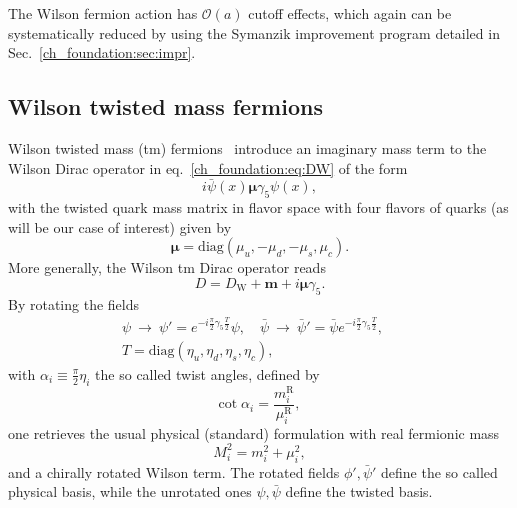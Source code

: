 The Wilson fermion action has $\mathcal{O}(a)$ cutoff effects, which again can be systematically reduced by using the Symanzik improvement program detailed in Sec.~\ref{ch_foundation:sec:impr}.


\subsection{Wilson twisted mass fermions}
\label{ch_foundation:subsec:tm}

Wilson twisted mass (tm) fermions~\cite{} introduce an imaginary mass term to the Wilson Dirac operator in eq.~\eqref{ch_foundation:eq:DW} of the form
\begin{equation}
i\bar{\psi}(x)\boldsymbol{\mu}\gamma_5\psi(x),
\end{equation}
with the twisted quark mass matrix in flavor space with four flavors of quarks (as will be our case of interest) given by
\begin{equation}
\boldsymbol{\mu}={\textrm{diag}}\left(\mu_u,-\mu_d,-\mu_s,\mu_c\right).
\end{equation}
More generally, the Wilson tm Dirac operator reads
\begin{equation}
D=D_{\textrm{W}}+\boldsymbol{m}+i\boldsymbol{\mu}\gamma_5.
\end{equation}
By rotating the fields
\begin{gather}
\label{ch_foundation:eq:chiral_rot}
\psi~\to~\psi' = e^{-i\frac{\pi}{2}\gamma_5 \frac{T}{2}}\psi, \quad
\bar{\psi}~\to~\bar{\psi}' = \bar{\psi} e^{-i\frac{\pi}{2}\gamma_5 \frac{T}{2}}, \quad \\
T = {\textrm{diag}}(\eta_u,\eta_d,\eta_s,\eta_c),
\end{gather}
with $\alpha_i\equiv\frac{\pi}{2}\eta_i$ the so called twist angles, defined by
\begin{equation}
{\textrm{cot}}\;\alpha_i=\frac{m_i^{\textrm{R}}}{\mu_i^{\textrm{R}}},
\end{equation}
one retrieves the usual physical (standard) formulation with real fermionic mass
\begin{equation}
M_i^2=m_i^2+\mu_i^2,
\end{equation}
and a chirally rotated Wilson term. The rotated fields $\phi',\bar{\psi}'$ define the so called physical basis, while the unrotated ones $\psi,\bar{\psi}$ define the twisted basis.

